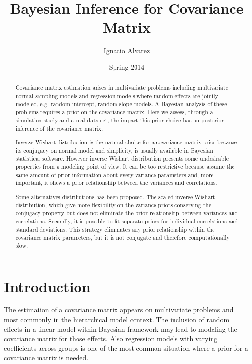 \documentclass{article}
\title{Bayesian Inference for  Covariance Matrix}
\author{Ignacio Alvarez}
\date{ Spring 2014 }
\begin{document}
 
\maketitle 


\begin{abstract}
Covariance matrix estimation arises in multivariate problems including multivariate normal sampling models and regression models where random effects are jointly modeled, e.g. random-intercept, random-slope models. A Bayesian analysis of these problems requires a prior on the covariance matrix. Here we assess, through a simulation study and a real data set, the impact this prior choice has on posterior inference of the covariance matrix.

Inverse Wishart distribution is the natural choice for a covariance matrix prior because its conjugacy on normal model and simplicity, is usually available in Bayesian statistical software. However inverse Wishart distribution presents some undesirable properties from a modeling point of view. It can be too restrictive because assume the same amount of prior information about every variance parameters and, more important, it shows a prior relationship between the variances and correlations.

Some alternatives distributions has been proposed. The scaled inverse Wishart distribution, which give more flexibility on the variance priors conserving the conjugacy property but does not eliminate the prior relationship between variances and correlations. Secondly, it is possible to fit separate priors for individual correlations and standard deviations. This strategy eliminates any prior relationship within the covariance matrix parameters, but it is not conjugate and therefore computationally slow. 
\end{abstract}

\newpage 
\tableofcontents

\newpage 
\doublespacing
{} 

\section{Introduction} 

The estimation of a covariance matrix appears on multivariate problems and most commonly in the hierarchical model context. The inclusion of random effects in a linear model within Bayesian framework may lead to modeling the covariance matrix for those effects. Also regression models with varying coefficients across groups is one of the most common situation where a prior for a covariance matrix is needed. 
\end{document}

